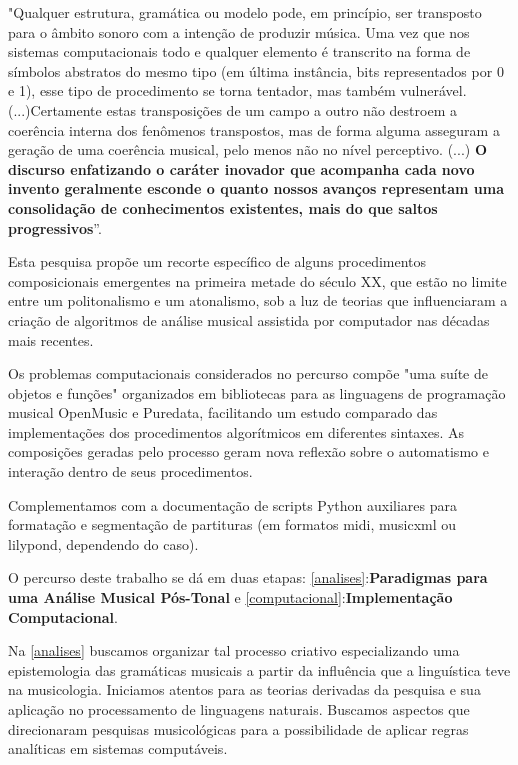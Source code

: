 \documentclass[
	12pt,				%
	openright,			%
	twoside,			%
	a4paper,			%
	english,			%
	french,				%
	spanish,			%
	brazil				%
	]{abntex2}
\begin{document}
\begin{citacao}
"Qualquer estrutura, gramática ou modelo pode, em princípio, ser transposto para o âmbito sonoro com a intenção de produzir música. Uma vez que nos sistemas computacionais todo e qualquer elemento é transcrito na forma de símbolos abstratos do mesmo tipo (em última instância, bits representados por 0 e 1), esse tipo de procedimento se torna tentador, mas também vulnerável.(...)Certamente estas transposições de um campo a outro não destroem a coerência interna dos fenômenos transpostos, mas de forma alguma asseguram a  geração de uma coerência musical, pelo menos não no nível perceptivo.
(...)
\textbf{O discurso enfatizando o caráter inovador que acompanha cada novo invento geralmente esconde o quanto nossos avanços representam uma consolidação  de conhecimentos existentes, mais do que saltos progressivos}”. \cite[p. 151-153, grifo nosso.]{iazzetta2009musica}
\end{citacao}

Esta pesquisa propõe um recorte específico de alguns procedimentos composicionais emergentes na primeira metade do século XX, que estão no limite entre um politonalismo e um atonalismo, sob a luz de teorias que influenciaram a criação de algoritmos de análise musical assistida por computador nas décadas mais recentes. 

Os problemas computacionais considerados no percurso compõe "uma suíte de objetos e funções" organizados em bibliotecas para as linguagens de programação musical OpenMusic e Puredata, facilitando um estudo comparado das implementações dos procedimentos algorítmicos em diferentes sintaxes. As composições geradas pelo processo geram nova reflexão sobre o automatismo e interação dentro de seus procedimentos.

Complementamos com a documentação de scripts Python auxiliares para formatação e segmentação de partituras (em formatos midi, musicxml ou lilypond, dependendo do caso).

O percurso deste trabalho se dá em duas etapas: \autoref{analises}:\textbf{Paradigmas para uma Análise Musical Pós-Tonal} e \autoref{computacional}:\textbf{Implementação Computacional}.

Na \autoref{analises} buscamos organizar tal processo criativo especializando uma epistemologia das gramáticas musicais a partir da influência que a linguística teve na musicologia. Iniciamos atentos para as teorias derivadas da pesquisa  e sua aplicação no processamento de linguagens naturais. Buscamos aspectos que direcionaram pesquisas musicológicas para a possibilidade de aplicar regras analíticas em sistemas computáveis.
\end{document}
